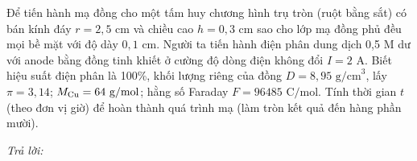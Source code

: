 \documentclass[11pt,a4paper]{article}
\def\loigiai#1{}
\begin{document}
\begin{ex}
Để tiến hành mạ đồng cho một tấm huy chương hình trụ tròn (ruột bằng sắt) có bán kính đáy $r = 2{,}5\text{ cm}$ và chiều cao $h = 0{,}3\text{ cm}$ sao cho lớp mạ đồng phủ đều mọi bề mặt với độ dày $0{,}1\text{ cm}$. Người ta tiến hành điện phân dung dịch  0,5 M dư với anode bằng đồng tinh khiết ở cường độ dòng điện không đổi $I = 2\text{ A}$. Biết hiệu suất điện phân là 100\%, khối lượng riêng của đồng $D = 8{,}95\text{ g/cm}^3$, lấy $\pi = 3{,}14$; $M_{\ce{Cu}} = 64\text{ g/mol}$; hằng số Faraday $F = 96485\text{ C/mol}$. Tính thời gian $t$ (theo đơn vị giờ) để hoàn thành quá trình mạ (làm tròn kết quả đến hàng phần mười).
\par\noindent\textit{Trả lời:} \dotfill
\loigiai{}
\end{ex}

\end{document}
